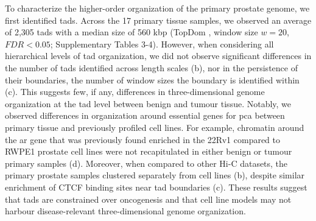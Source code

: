 
To characterize the higher-order organization of the primary prostate genome, we first identified \glspl{tad}.
Across the 17 primary tissue samples, we observed an average of 2,305 \glspl{tad} with a median size of 560 kbp (TopDom \cite{shinTopDomEfficientDeterministic2016}, window size $w = 20$, $FDR < 0.05$; Supplementary Tables 3-4).
However, when considering all hierarchical levels of \gls{tad} organization, we did not observe significant differences in the number of \glspl{tad} identified across length scales (b), nor in the persistence of their boundaries, the number of window sizes the boundary is identified within (c).
This suggests few, if any, differences in three-dimensional genome organization at the \gls{tad} level between benign and tumour tissue.
Notably, we observed differences in organization around essential genes for \gls{pca} between primary tissue and previously profiled cell lines.
For example, chromatin around the \gls{ar} gene that was previously found enriched in the 22Rv1 compared to RWPE1 prostate cell lines \cite{rhieHighresolution3DEpigenomic2019} were not recapitulated in either benign or tumour primary samples (d).
Moreover, when compared to other Hi-C datasets, the primary prostate samples clustered separately from cell lines (b), despite similar enrichment of CTCF binding sites near \gls{tad} boundaries (c).
These results suggest that \glspl{tad} are constrained over oncogenesis and that cell line models may not harbour disease-relevant three-dimensional genome organization.

